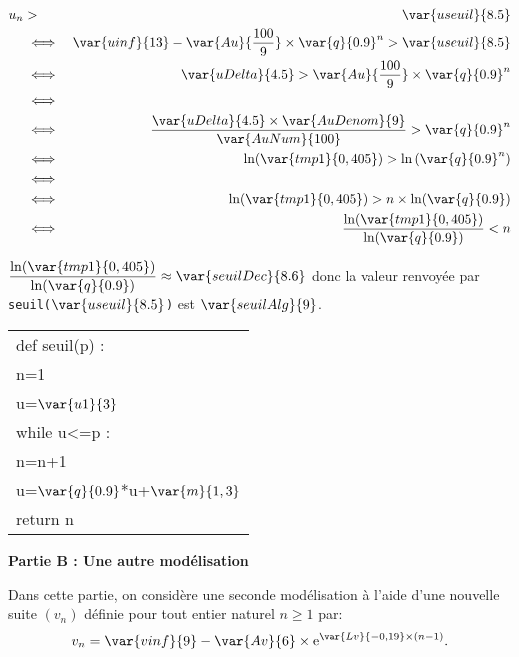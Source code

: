 \begin{minipage}{0.62\linewidth}
\begin{enumerate}
{\begin{minipage}{0.72\linewidth}
\begin{eqnarray*}
u_n&>&\var{useuil}{8.5} \\
& \iff &\var{uinf}{13} -\var{Au}{\dfrac{100}{9}}\times \var{q}{0.9}^n > \var{useuil}{8.5}\\
& \iff & \var{uDelta}{4.5} > \var{Au}{\dfrac{100}{9}}\times \var{q}{0.9}^n\\
& \iff &\phantom{u_n>\var{useuil}{8.5}}  \\
& \iff & \dfrac{\var{uDelta}{4.5}\times \var{AuDenom}{9}}{\var{AuNum}{100}}> \var{q}{0.9}^n \\
& \iff &\ln(\var{tmp1}{0,405}) > \ln \left (\var{q}{0.9}^n\right )\\
& \iff &\phantom{u_n>\var{useuil}{8.5}} \\
& \iff &\ln(\var{tmp1}{0,405}) >n \times \ln  (\var{q}{0.9}) \\
& \iff &\dfrac{\ln(\var{tmp1}{0,405})}{\ln(\var{q}{0.9})} <n
\end{eqnarray*}

\end{minipage}\hfill


$\dfrac{\ln(\var{tmp1}{0,405})}{\ln(\var{q}{0.9})} \approx \var{seuilDec}{8.6}$ donc la valeur renvoyée par \texttt{seuil($\var{useuil}{8.5}$)} est $\var{seuilAlg}{9}$.
} %

\end{enumerate}
\end{minipage}\hfill
\begin{minipage}{0.32\linewidth}
\renewcommand\arraystretch{0.9}

\begin{tabular}{|l|} \hline
def seuil(p) :\\
\qquad n=1\\
\qquad u=$\var{u1}{3}$\\
\qquad while u<=p :\\
\qquad  \qquad n=n+1\\
\qquad \qquad u=$\var{q}{0.9}$*u+$\var{m}{1,3}$ \\
\qquad return n\\ \hline
\end{tabular}
\end{minipage}

\bigskip

\textbf{Partie B : Une autre modélisation}

\medskip

Dans cette partie, on considère une seconde modélisation à l'aide d'une nouvelle
suite $\left(v_n\right)$ définie pour tout entier naturel $n \geqslant 1$ par:
\[v_n = \var{vinf}{9} - \var{Av}{6} \times \text{e}^{\var{Lv}{-0,19}\times(n - 1)}.\]

